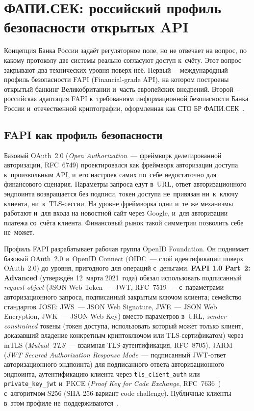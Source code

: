 \section{ФАПИ.СЕК: российский профиль безопасности открытых API}\label{sec:fapi-sec}

Концепция Банка России задаёт регуляторное поле, но не отвечает
на вопрос, по какому протоколу две системы реально согласуют
доступ к~счёту. Этот вопрос закрывают два технических уровня
поверх неё. Первый~-- международный профиль безопасности FAPI
(Financial-grade API), на котором построены открытый банкинг
Великобритании и~часть европейских внедрений. Второй~--
российская адаптация FAPI к~требованиям информационной безопасности
Банка России и~отечественной криптографии, оформленная как
СТО БР ФАПИ.СЕК~\cite{fapi-sec-2024}.

\subsection*{FAPI как профиль безопасности}

Базовый OAuth~2.0 (\textit{Open Authorization}~--- фреймворк делегированной
авторизации, RFC~6749) проектировался как фреймворк авторизации
доступа к~произвольным API, и~его настроек самих по~себе
недостаточно для финансового сценария. Параметры запроса
едут в~URL, ответ авторизационного эндпоинта возвращается
без подписи, токен доступа не~привязан ни~к~ключу клиента,
ни~к~TLS-сессии. На уровне фреймворка одни и~те же механизмы работают
и~для входа на новостной сайт через Google, и~для авторизации
платежа со~счёта клиента. Финансовый рынок такой симметрии позволить себе не~может.

Профиль FAPI разрабатывает рабочая группа OpenID Foundation. Он
поднимает базовый OAuth~2.0 и~OpenID Connect (OIDC~--- слой идентификации
поверх OAuth~2.0) до уровня, пригодного
для операций с~деньгами. \textbf{FAPI 1.0 Part~2: Advanced}
(утверждён 12~марта 2021~года) обязал использовать подписанный
\textit{request object} (JSON Web Token~--- JWT, RFC~7519~--- с~параметрами
авторизационного запроса, подписанный закрытым ключом клиента;
семейство стандартов JOSE: JWS~--- JSON Web Signature, JWE~--- JSON Web
Encryption, JWK~--- JSON Web Key) вместо параметров в~URL,
\textit{sender-constrained} токены (токен доступа, использовать который
может только клиент, доказавший владение конкретным криптоключом
или TLS-сертификатом) через mTLS (\textit{Mutual~TLS}~--- взаимная
TLS-аутентификация, RFC~8705), JARM (\textit{JWT Secured Authorization
Response Mode}~--- подписанный JWT-ответ авторизационного эндпоинта)
для подписанного ответа авторизационного эндпоинта,
аутентификацию клиента через \texttt{tls\_client\_auth}
или \texttt{private\_key\_jwt} и~PKCE (\textit{Proof Key for Code Exchange},
RFC~7636~\cite{rfc-7636-pkce}) с~алгоритмом S256
(SHA-256-вариант code challenge).
Публичные клиенты в~этом профиле не~поддерживаются~\cite{fapi-1-part2}.

